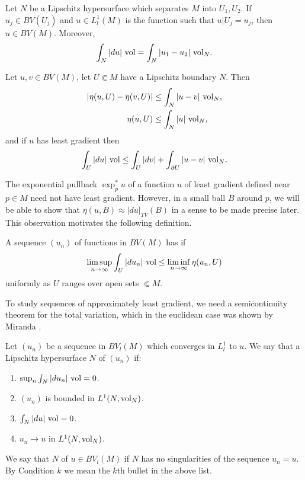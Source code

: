 \begin{proposition}[gluing]\label{gluing}
Let $N$ be a Lipschitz hypersurface which separates $M$ into $U_1,U_2$.
If $u_j \in BV(U_j)$ and $u \in L^1_l(M)$ is the function such that $u|U_j = u_j$, then $u \in BV(M)$.
Moreover,
\begin{equation}
\label{glued BV norm}
\int_N |du| ~\mathrm{vol} = \int_N |u_1 - u_2| ~\mathrm{vol}_N.
\end{equation}
\end{proposition}

\begin{proposition}\label{estimates on good set}
Let $u, v \in BV(M)$, let $U \Subset M$ have a Lipschitz boundary $N$. Then
\begin{align}
|\eta(u, U) - \eta(v, U)| &\leq \int_N |u - v| ~\mathrm{vol}_N, \label{a priori estimate 1}\\
\eta(u, U) &\leq \int_N |u| ~\mathrm{vol}_N, \label{a priori estimate 2}
\end{align}
and if $u$ has least gradient then
\begin{equation}
\int_U |du| ~\mathrm{vol} \leq \int_U |dv| + \int_{\partial U} |u - v| ~\mathrm{vol}_N. \label{a priori estimate 3}
\end{equation}
\end{proposition}

The exponential pullback $\exp_p^* u$ of a function $u$ of least gradient defined near $p \in M$ need not have least gradient.
However, in a small ball $B$ around $p$, we will be able to show that $\eta(u, B) \approx |du|_{TV}(B)$ in a sense to be made precise later.
This observation motivates the following definition.

\begin{definition}
A sequence $(u_n)$ of functions in $BV(M)$ has  if
$$\limsup_{n \to \infty} \int_U |du_n| ~\mathrm{vol} \leq \liminf_{n \to \infty} \eta(u_n, U)$$
uniformly as $U$ ranges over open sets $\Subset M$.
\end{definition}

To study sequences of approximately least gradient, we need a semicontinuity theorem for the total variation, which in the euclidean case was shown by Miranda \cite[Teorema 3]{Miranda67}.

\begin{definition}
Let $(u_n)$ be a sequence in $BV_l(M)$ which converges in $L^1_l$ to $u$.
We say that a Lipschitz hypersurface $N$  of $(u_n)$ if:
\begin{enumerate}
\item \label{cond1Mir} $\sup_n \int_N |du_n| ~\mathrm{vol} = 0$.
\item \label{cond2Mir} $(u_n)$ is bounded in $L^1(N, \mathrm{vol}_N)$.
\item \label{cond3Mir} $\int_N |du| ~\mathrm{vol} = 0$.
\item \label{cond4Mir} $u_n \to u$ in $L^1(N, \mathrm{vol}_N)$.
\end{enumerate}
We say that $N$  of $u \in BV_l(M)$ if $N$ has no singularities of the sequence $u_n = u$.
By Condition $k$ we mean the $k$th bullet in the above list.
\end{definition}

